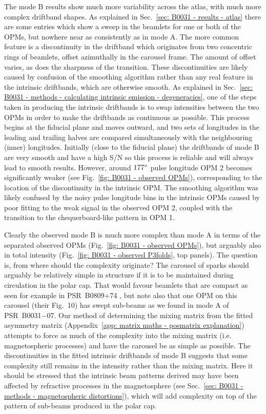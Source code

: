 The mode B results show much more variability across the atlas, with much more complex driftband shapes. As explained in Sec.~\ref{sec: B0031 - results - atlas} there are some entries which show a sweep in the beamlets for one or both of the OPMs, but nowhere near as consistently as in mode A. The more common feature is a discontinuity in the driftband which originates from two concentric rings of beamlets, offset azimuthally in the carousel frame. The amount of offset varies, as does the sharpness of the transition. These discontinuities are likely caused by confusion of the smoothing algorithm rather than any real feature in the intrinsic driftbands, which are otherwise smooth. As explained in Sec.~\ref{sec: B0031 - methods - calculating intrinsic emission - degeneracies}, one of the steps taken in producing the intrinsic driftbands is to swap intensities between the two OPMs in order to make the driftbands as continuous as possible. This process begins at the fiducial plane and moves outward, and two sets of longitudes in the leading and trailing halves are compared simultaneously with the neighbouring (inner) longitudes. Initially (close to the fiducial plane) the driftbands of mode B are very smooth and have a high S/N so this process is reliable and will always lead to smooth results. However, around $177^\circ$ pulse longitude OPM 2 becomes significantly weaker (see Fig.~\ref{fig: B0031 - observed OPMs}), corresponding to the location of the discontinuity in the intrinsic OPM. The smoothing algorithm was likely confused by the noisy pulse longitude bins in the intrinsic OPMs caused by poor fitting to the weak signal in the observed OPM 2, coupled with the transition to the chequerboard-like pattern in OPM 1.

Clearly the observed mode B is much more complex than mode A in terms of the separated observed OPMs (Fig.~\ref{fig: B0031 - observed OPMs}), but arguably also in total intensity (Fig.~\ref{fig: B0031 - observed P3folds}, top panels). The question is, from where should the complexity originate? The carousel of sparks should arguably be relatively simple in structure if it is to be maintained during circulation in the polar cap. That would favour beamlets that are compact as seen for example in PSR~B0809+74 \citep{RRL+2006}, but note also that one OPM on this carousel (their Fig.~10) has swept sub-beams as we found in mode A of PSR~B0031$-$07. Our method of determining the mixing matrix from the fitted asymmetry matrix (Appendix~\ref{app: matrix maths - posmatrix explanation}) attempts to force as much of the complexity into the mixing matrix (i.e. magnetospheric processes) and have the carousel be as simple as possible. The discontinuities in the fitted intrinsic driftbands of mode B suggests that some complexity still remains in the intensity rather than the mixing matrix. Here it should be stressed that the intrinsic beam patterns derived may have been affected by refractive processes in the magnetosphere (see Sec.~\ref{sec: B0031 - methods - magnetospheric distortions}), which will add complexity on top of the pattern of sub-beams produced in the polar cap.


